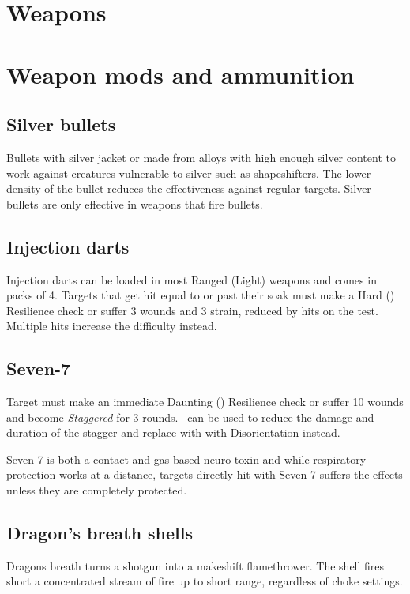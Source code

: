 \documentclass{book}
\begin{document}
\section{Weapons}

\section{Weapon mods and ammunition}
\begin{multicols}{2}
	\subsection{Silver bullets}\label{silver}
	Bullets with silver jacket or made from alloys with high enough silver content to work against creatures vulnerable to silver such as shapeshifters. The lower density of the bullet reduces the effectiveness against regular targets. Silver bullets are only effective in weapons that fire bullets.
	
	\subsection{Injection darts}
	Injection darts can be loaded in most Ranged (Light) weapons and comes in packs of 4. Targets that get hit equal to or past their soak must make a Hard (\DifficultyDie \DifficultyDie \DifficultyDie) Resilience check or suffer 3 wounds and 3 strain, reduced by hits on the test. Multiple hits increase the difficulty instead.
	
	\subsection{Seven-7}
	Target must make an immediate Daunting (\DifficultyDie \DifficultyDie \DifficultyDie \DifficultyDie) Resilience check or suffer 10 wounds and become \textit{Staggered} for 3 rounds. \Advantage\ can be used to reduce the damage and duration of the stagger and replace with with Disorientation instead. 
	
	Seven-7 is both a contact and gas based neuro-toxin and while respiratory protection works at a distance, targets directly hit with Seven-7 suffers the effects unless they are completely protected.
	
	\subsection{Dragon's breath shells}
	Dragons breath turns a shotgun into a makeshift flamethrower. The shell fires short a concentrated stream of fire up to short range, regardless of choke settings.
	
\end{multicols}
\end{document}
